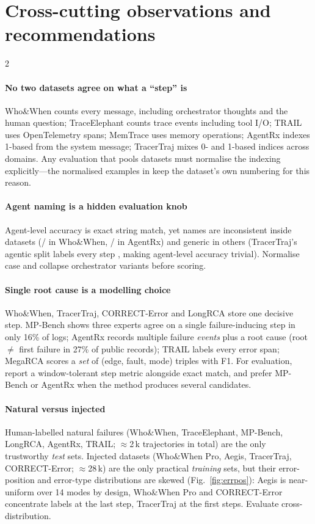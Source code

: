 \section{Cross-cutting observations and recommendations}\label{sec:reco}

\begin{multicols}{2}
\paragraph{No two datasets agree on what a ``step'' is} Who\&When counts every message, including orchestrator thoughts and the human question; TraceElephant counts trace events including tool I/O; TRAIL uses OpenTelemetry spans; MemTrace uses memory operations; AgentRx indexes 1-based from the system message; TracerTraj mixes 0- and 1-based indices across domains. Any evaluation that pools datasets must normalise the indexing explicitly---the normalised examples in  keep the dataset's own numbering for this reason.

\paragraph{Agent naming is a hidden evaluation knob} Agent-level accuracy is exact string match, yet names are inconsistent inside datasets (/ in Who\&When, / in AgentRx) and generic in others (TracerTraj's agentic split labels every step , making agent-level accuracy trivial). Normalise case and collapse orchestrator variants before scoring.

\paragraph{Single root cause is a modelling choice} Who\&When, TracerTraj, CORRECT-Error and LongRCA store one decisive step. MP-Bench shows three experts agree on a single failure-inducing step in only 16\% of logs; AgentRx records multiple failure \emph{events} plus a root cause (root $\ne$ first failure in 27\% of public records); TRAIL labels every error span; MegaRCA scores a \emph{set} of (edge, fault, mode) triples with F1. For evaluation, report a window-tolerant step metric alongside exact match, and prefer MP-Bench or AgentRx when the method produces several candidates.

\paragraph{Natural versus injected} Human-labelled natural failures (Who\&When, TraceElephant, MP-Bench, LongRCA, AgentRx, TRAIL; $\approx$2\,k trajectories in total) are the only trustworthy \emph{test} sets. Injected datasets (Who\&When Pro, Aegis, TracerTraj, CORRECT-Error; $\approx$28\,k) are the only practical \emph{training} sets, but their error-position and error-type distributions are skewed (Fig.~\ref{fig:errpos}): Aegis is near-uniform over 14 modes by design, Who\&When Pro and CORRECT-Error concentrate labels at the last step, TracerTraj at the first steps. Evaluate cross-distribution.


\end{multicols}
